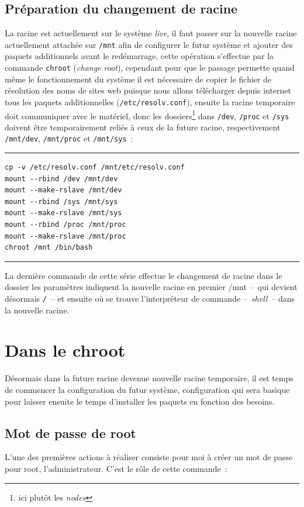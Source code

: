 \documentclass[12pt, a4paper]{report}
\begin{document}
\section{Préparation du changement de racine}
La racine est actuellement sur le système \emph{live}, il faut passer sur la nouvelle racine actuellement attachée sur \texttt{/mnt} afin de configurer le futur système et ajouter des paquets additionnels avant le redémarrage, cette opération s'effectue par la commande \texttt{chroot} (\emph{change root}), cependant pour que le passage permette quand même le fonctionnement du système il est nécessaire de copier le fichier de résolution des noms de sites web puisque nous allons télécharger depuis internet tous les paquets additionnelles (\texttt{/etc/resolv.conf}), ensuite la racine temporaire doit communiquer avec le matériel, donc les dossiers\footnote{ici plutôt les \emph{nodes}} dans \texttt{/dev}, \texttt{/proc} et \texttt{/sys} doivent être temporairement reliés à ceux de la future racine, respectivement \texttt{/mnt/dev}, \texttt{/mnt/proc} et \texttt{/mnt/sys}~:

\noindent \rule{\linewidth}{0.5pt}
\begin{verbatim}
cp -v /etc/resolv.conf /mnt/etc/resolv.conf
mount --rbind /dev /mnt/dev
mount --make-rslave /mnt/dev
mount --rbind /sys /mnt/sys
mount --make-rslave /mnt/sys
mount --rbind /proc /mnt/proc
mount --make-rslave /mnt/proc
chroot /mnt /bin/bash
\end{verbatim}
\rule{\linewidth}{0.5pt}

La dernière commande de cette série effectue le changement de racine dans le dossier les paramètres indiquent la nouvelle racine en premier /mnt --~qui devient désormais \texttt{/}~-- et ensuite où se trouve l'interpréteur de commande --~\emph{shell}~-- dans la nouvelle racine.

\chapter{Dans le chroot}

Désormais dans la future racine devenue nouvelle racine temporaire, il est temps de commencer la configuration du futur système, configuration qui sera basique pour laisser ensuite le temps d'installer les paquets en fonction des besoins.

\section{Mot de passe de root}
L'une des premières actions à réaliser consiste pour moi à créer un mot de passe pour root, l'administrateur. 
C'est le rôle de cette commande~:
\end{document}
